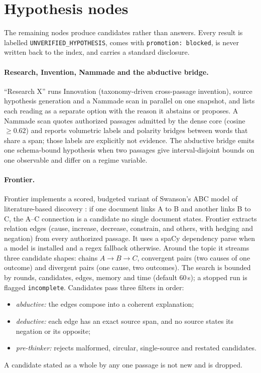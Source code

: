\documentclass[11pt]{article}
\begin{document}
\section{Hypothesis nodes}
\label{sec:hyp}

The remaining nodes produce candidates rather than answers. Every result is labelled
\texttt{UNVERIFIED\_HYPOTHESIS}, comes with \texttt{promotion: blocked}, is never written back to the index, and carries a standard disclosure.

\paragraph{Research, Invention, Nammade and the abductive bridge.} ``Research X'' runs Innovation (taxonomy-driven
cross-passage invention), source hypothesis generation and a Nammade scan in parallel on one snapshot, and lists
each reading as a separate option with the reason it abstains or proposes. A Nammade scan quotes authorized
passages admitted by the dense core (cosine~$\ge 0.62$) and reports volumetric labels and polarity bridges between
words that share a span; those labels are explicitly not evidence. The abductive bridge emits one schema-bound
hypothesis when two passages give interval-disjoint bounds on one observable and differ on a regime variable.

\paragraph{Frontier.} Frontier implements a scored, budgeted variant of Swanson's ABC model of literature-based
discovery \cite{swanson1986fish,swanson1997arrowsmith,henry2017lbd}: if one document links A to B and another links
B to C, the A--C connection is a candidate no single document states. Frontier extracts relation edges
(cause, increase, decrease, constrain, and others, with hedging and negation) from every authorized passage.
It uses a spaCy dependency parse when a model is installed \cite{honnibal2020spacy} and a regex fallback otherwise.
Around the topic it streams three candidate shapes: chains $A\to B\to C$, convergent pairs (two causes of one
outcome) and divergent pairs (one cause, two outcomes). The search is bounded by rounds, candidates, edges, memory
and time (default 60\,s); a stopped run is flagged \texttt{incomplete}. Candidates pass three filters in order:
\begin{itemize}
  \item \emph{abductive:} the edges compose into a coherent explanation;
  \item \emph{deductive:} each edge has an exact source span, and no source states its negation or its opposite;
  \item \emph{pre-thinker:} rejects malformed, circular, single-source and restated candidates.
\end{itemize}
A candidate stated as a whole by any one passage is not new and is dropped.
\end{document}
